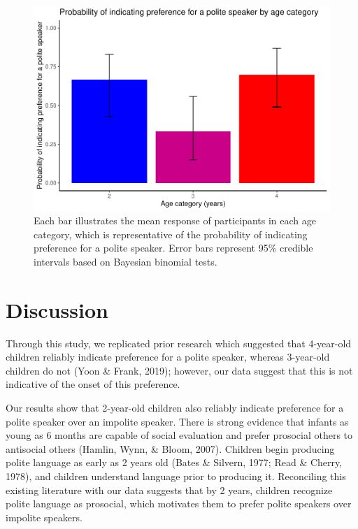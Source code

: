 \documentclass[
  english,
  man,floatsintext]{apa6}
\begin{document}
\begin{figure}
\centering
\includegraphics{writeup_files/figure-latex/unnamed-chunk-2-1.pdf}
\caption{\label{fig:unnamed-chunk-2}Each bar illustrates the mean response of participants in each age category, which is representative of the probability of indicating preference for a polite speaker. Error bars represent 95\% credible intervals based on Bayesian binomial tests.}
\end{figure}

\hypertarget{discussion}{%
\section{Discussion}\label{discussion}}

Through this study, we replicated prior research which suggested that 4-year-old children reliably indicate preference for a polite speaker, whereas 3-year-old children do not (Yoon \& Frank, 2019); however, our data suggest that this is not indicative of the onset of this preference.

Our results show that 2-year-old children also reliably indicate preference for a polite speaker over an impolite speaker. There is strong evidence that infants as young as 6 months are capable of social evaluation and prefer prosocial others to antisocial others (Hamlin, Wynn, \& Bloom, 2007). Children begin producing polite language as early as 2 years old (Bates \& Silvern, 1977; Read \& Cherry, 1978), and children understand language prior to producing it. Reconciling this existing literature with our data suggests that by 2 years, children recognize polite language as prosocial, which motivates them to prefer polite speakers over impolite speakers.
\end{document}
